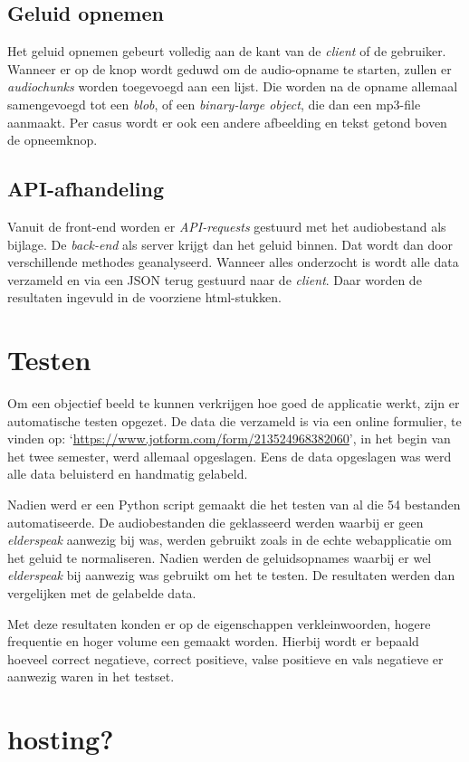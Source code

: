 \subsection{Geluid opnemen}
Het geluid opnemen gebeurt volledig aan de kant van de \textit{client} of de gebruiker. Wanneer er op de knop wordt geduwd om de audio-opname te starten, zullen er \textit{audiochunks } worden toegevoegd aan een lijst. Die worden na de opname allemaal samengevoegd tot een \textit{blob}, of een \textit{binary-large object}, die dan een mp3-file aanmaakt.
Per casus wordt er ook een andere afbeelding en tekst getond boven de opneemknop.

\subsection{API-afhandeling}
Vanuit de front-end worden er \textit{API-requests} gestuurd met het audiobestand als bijlage. De \textit{back-end} als server krijgt dan het geluid binnen. Dat wordt dan door verschillende methodes geanalyseerd. Wanneer alles onderzocht is wordt alle data verzameld en via een JSON terug gestuurd naar de \textit{client}. Daar worden de resultaten ingevuld in de voorziene html-stukken.


\section{Testen}
Om een objectief beeld te kunnen verkrijgen hoe goed de applicatie werkt, zijn er automatische testen opgezet. De data die verzameld is via een online formulier, te vinden op:  `\url{https://www.jotform.com/form/213524968382060}', in het begin van het twee semester, werd allemaal opgeslagen. Eens de data opgeslagen was werd alle data beluisterd en handmatig gelabeld.

Nadien werd er een Python script gemaakt die het testen van al die 54 bestanden automatiseerde. De audiobestanden die geklasseerd werden waarbij er geen \textit{elderspeak} aanwezig bij was, werden gebruikt zoals in de echte webapplicatie om het geluid te normaliseren. Nadien werden de geluidsopnames waarbij er wel \textit{elderspeak} bij aanwezig was gebruikt om het te testen. De resultaten werden dan vergelijken met de gelabelde data.

Met deze resultaten konden er op de eigenschappen verkleinwoorden, hogere frequentie en hoger volume een  gemaakt worden. Hierbij wordt er bepaald hoeveel correct negatieve, correct positieve, valse positieve en vals negatieve er aanwezig waren in het testset.

\section{hosting?}

